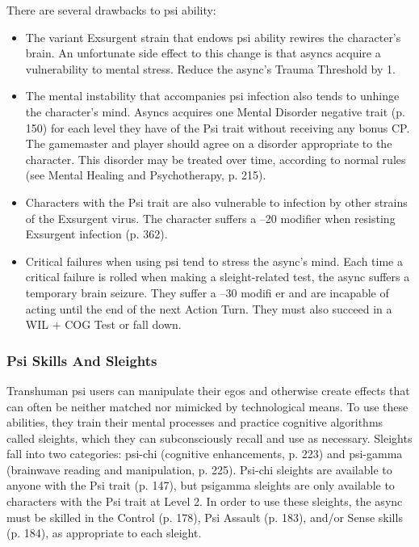 There are several drawbacks to psi ability:

\begin{itemize}
\item The variant Exsurgent strain that endows psi ability
rewires the character’s brain. An unfortunate side
effect to this change is that asyncs acquire a vulnerability
to mental stress. Reduce the async’s Trauma
Threshold by 1.
\item The mental instability that accompanies psi infection
also tends to unhinge the character’s mind.
Asyncs acquires one Mental Disorder negative trait
(p. 150) for each level they have of the Psi trait
without receiving any bonus CP. The gamemaster
and player should agree on a disorder appropriate
to the character. This disorder may be treated over
time, according to normal rules (see Mental Healing
and Psychotherapy, p. 215).
\item Characters with the Psi trait are also vulnerable to
infection by other strains of the Exsurgent virus.
The character suffers a –20 modifier when resisting
Exsurgent infection (p. 362).
\item Critical failures when using psi tend to stress the
async’s mind. Each time a critical failure is rolled
when making a sleight-related test, the async suffers
a temporary brain seizure. They suffer a –30 modifi
er and are incapable of acting until the end of the
next Action Turn. They must also succeed in a WIL
+ COG Test or fall down.
\end{itemize}

\subsubsection{Psi Skills And Sleights}

Transhuman psi users can manipulate their egos and
otherwise create effects that can often be neither
matched nor mimicked by technological means. To use
these abilities, they train their mental processes and
practice cognitive algorithms called sleights, which
they can subconsciously recall and use as necessary.
Sleights fall into two categories: psi-chi (cognitive
enhancements, p. 223) and psi-gamma (brainwave
reading and manipulation, p. 225). Psi-chi sleights are
available to anyone with the Psi trait (p. 147), but psigamma
sleights are only available to characters with
the Psi trait at Level 2. In order to use these sleights,
the async must be skilled in the Control (p. 178), Psi
Assault (p. 183), and/or Sense skills (p. 184), as appropriate
to each sleight.

